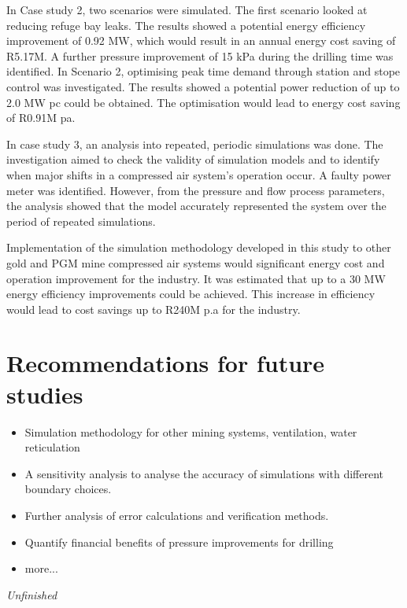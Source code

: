 	 \par
	 In Case study 2, two scenarios were simulated. The first scenario looked at reducing refuge bay leaks. The results showed a potential energy efficiency improvement of 0.92 MW, which would result in an annual energy cost saving of R5.17M. A further pressure improvement of 15 kPa during the drilling time was identified. In Scenario 2, optimising peak time demand through station and stope control was investigated. The results showed a potential power reduction of up to 2.0 MW \gls{pc} could be obtained. The optimisation would lead to energy cost saving of R0.91M \gls{pa}.
	 \par 
	 In case study 3, an analysis into repeated, periodic simulations was done. The investigation aimed to check the validity of simulation models and to identify when major shifts in a compressed air system’s operation occur. A faulty power meter was identified. However, from the pressure and flow process parameters, the analysis showed that the model accurately represented the system over the period of repeated simulations.
	 \par
	 Implementation of the simulation methodology developed in this study to other gold and PGM mine compressed air systems would significant energy cost and operation improvement for the industry. It was estimated that up to a 30 MW energy efficiency improvements could be achieved. This increase in efficiency would lead to cost savings up to R240M p.a for the industry. 
	 \section{Recommendations for future studies}
	 \begin{itemize}
	 	\item Simulation methodology for other mining systems, ventilation, water reticulation 
	 	\item A sensitivity analysis to analyse the accuracy of simulations with different boundary choices.
	 	\item Further analysis of error calculations and verification methods.
	 	\item Quantify financial benefits of pressure improvements for drilling
	 	\item more...
	 	
	 \end{itemize}
	 \textit{Unfinished}
	 